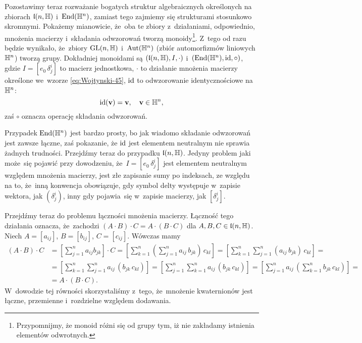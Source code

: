 \documentclass[a4paper,11pt]{article}
\begin{document}
Pozostawimy teraz rozważanie bogatych struktur algebraicznych określonych
na zbiorach $\mathfrak{l}( n, \mathbb{H} )$ i~$\mathrm{End}( \mathbb{H}^{ n } )$, zamiast tego
zajmiemy się strukturami stosunkowo skromnymi. Pokażemy mianowicie, że~oba
te zbiory z~działaniami, odpowiednio, mnożenia macierzy i~składania
odwzorowań tworzą monoidy\footnote{Przypomnijmy, że monoid różni się od
  grupy tym, iż nie zakładamy istnienia elementów odwrotnych.}. Z~tego od
razu będzie wynikało, że~zbiory $\mathrm{GL}( n, \mathbb{H} )$ i~$\mathrm{Aut}( \mathbb{H}^{ n } )$
(zbiór automorfizmów liniowych $\mathbb{H}^{ n }$) tworzą grupy. Dokładniej
monoidami są $( \mathfrak{l}( n, \mathbb{H} ), I, \cdot )$
i~$( \mathrm{End}( \mathbb{H}^{ n } ), \mathrm{id}, \circ )$, gdzie $I = [ e_{ 0 } \, \delta^{ i }_{ j } ]$ to
macierz jednostkowa, $\cdot$ to działanie mnożenia macierzy określone we~wzorze \eqref{eq:Wojtynski-45}, $\mathrm{id}$ to odwzorowanie identycznościowe
na~$\mathbb{H}^{ n }$:
\begin{equation}
  \label{eq:Wojtynski-80}
  \mathrm{id}( \mathbf{v} ) = \mathbf{v}, \quad \mathbf{v} \in \mathbb{H}^{ n },
\end{equation}
zaś $\circ$ oznacza operację składania odwzorowań.

Przypadek $\mathrm{End}( \mathbb{H}^{ n } )$ jest bardzo prosty, bo jak wiadomo składanie
odwzorowań jest zawsze łączne, zaś pokazanie, że $\mathrm{id}$ jest elementem
neutralnym nie sprawia żadnych trudności. Przejdźmy teraz do przypadku
$\mathfrak{l}( n, \mathbb{H} )$. Jedyny problem jaki może~się pojawić przy dowodzeniu,
że~$I = [ e_{ 0 } \, \delta^{ i }_{ j } ]$ jest elementem neutralnym względem
mnożenia macierzy, jest złe zapisanie sumy po indeksach, ze względu na to,
że~inną konwencja obowiązuje, gdy symbol delty występuje w~zapisie wektora,
jak $( \delta^{ i }_{ j } )$, inny gdy pojawia~się w~zapisie macierzy,
jak $[ \delta^{ i }_{ j } ]$.

Przejdźmy teraz do problemu łączności mnożenia macierzy. Łączność tego
działania oznacza, że~zachodzi $( A \cdot B ) \cdot C = A \cdot ( B \cdot C )$ dla
$A, B, C \in \mathfrak{l}( n, \mathbb{H} )$. Niech $A = [ a_{ i j } ]$, $B = [ b_{ i j } ]$,
$C = [ c_{ i j } ]$. Wówczas mamy
\begin{equation}
  \label{eq:Wojtynski-81}
  \begin{split}
    ( A \cdot B ) \cdot C
    &=
      \left[ \sum_{ j = 1 }^{ n } a_{ i j } b_{ j k } \right] \cdot C =
      \left[ \sum_{ k = 1 }^{ n } \left( \sum_{ j = 1 }^{ n } a_{ i j } \,
      b_{ j k } \right) \, c_{ k l } \right] =
      \left[ \sum_{ k = 1 }^{ n } \sum_{ j = 1 }^{ n } ( a_{ i j } \, b_{ j k } ) \,
      c_{ k l } \right] = \\[0.4em]
    &=
      \left[ \sum_{ k = 1 }^{ n } \sum_{ j = 1 }^{ n } a_{ i j } \, ( b_{ j k } \,
      c_{ k l } ) \right] =
      \left[ \sum_{ j = 1 }^{ n } \sum_{ k = 1 }^{ n } a_{ i j } \, ( b_{ j k } \,
      c_{ k l } ) \right] =
      \left[ \sum_{ j = 1 }^{ n } a_{ i j } \,
      \left( \sum_{ k = 1 }^{ n } b_{ j k } \, c_{ k l } \right) \right]
      = \\[0.4em]
    &=
      A \cdot ( B \cdot C ).
  \end{split}
\end{equation}
W~dowodzie tej równości skorzystaliśmy z~tego, że~mnożenie kwaternionów
jest łączne, przemienne i~rozdzielne względem dodawania.
\end{document}
